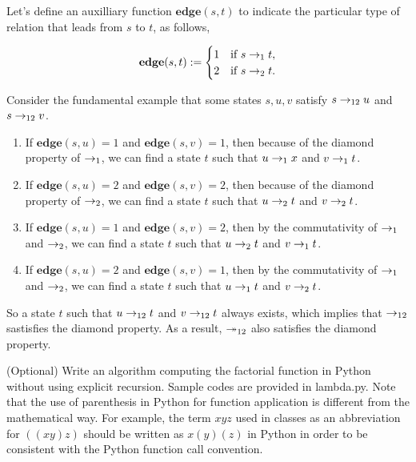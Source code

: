 \documentclass{homework}
\begin{document}
\begin{solution}

  Let's define an auxilliary function $\mathbf{edge}(s, t)$
  to indicate the particular type of relation that leads from $s$ to $t$,
  as follows,

  \begin{equation*}
    \mathbf{edge}(s, t):= \begin{cases}
      1 & \text{if } s \rightarrow_{1} t,\\
      2 & \text{if } s \rightarrow_{2} t.
    \end{cases}
  \end{equation*}

  Consider the fundamental example that
  some states $s, u, v$ satisfy $s \rightarrow_{12} u$ and $s \rightarrow_{12} v$.
  
  \begin{enumerate}
    \item If $\mathbf{edge}(s, u) = 1$ and $\mathbf{edge}(s, v) = 1$,
    then because of the diamond property of $\rightarrow_{1}$,
    we can find a state $t$ such that $u \rightarrow_{1} x$ and $v \rightarrow_{1} t$.
    \item If $\mathbf{edge}(s, u) = 2$ and $\mathbf{edge}(s, v) = 2$, 
    then because of the diamond property of $\rightarrow_{2}$,
    we can find a state $t$ such that $u \rightarrow_{2} t$ and $v \rightarrow_{2} t$.
    \item If $\mathbf{edge}(s, u) = 1$ and $\mathbf{edge}(s, v) = 2$,
    then by the commutativity of $\rightarrow_{1}$ and $\rightarrow_{2}$,
    we can find a state $t$ such that $u \rightarrow_{2} t$ and $v \rightarrow_{1} t$.
    \item If $\mathbf{edge}(s, u) = 2$ and $\mathbf{edge}(s, v) = 1$,
    then by the commutativity of $\rightarrow_{1}$ and $\rightarrow_{2}$,
    we can find a state $t$ such that $u \rightarrow_{1} t$ and $v \rightarrow_{2} t$.
  \end{enumerate}

  So a state $t$ such that $u \rightarrow_{12} t$ and $v \rightarrow_{12} t$ always exists,
  which implies that $\rightarrow_{12}$ sastisfies the diamond property.
  As a result, $\twoheadrightarrow_{12}$ also satisfies the diamond property.

\end{solution}

\begin{problem}
  (Optional) Write an algorithm computing the factorial function in Python
  without using explicit recursion.
  Sample codes are provided in \textsf{lambda.py}.
  Note that the use of parenthesis in Python for function application is
  different from the mathematical way.
  For example, the term $xyz$ used in classes as an abbreviation for $((xy)z)$
  should be written as $x(y)(z)$ in Python in order to be consistent with the
  Python function call convention.
\end{problem}
\end{document}
